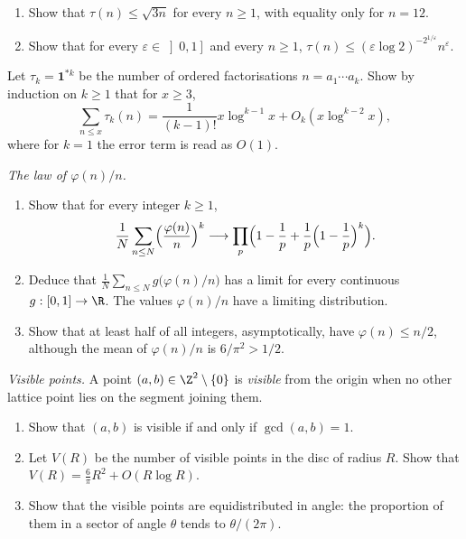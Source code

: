 \begin{exercise}[$\star\star$]\label{ex:taubound}
\begin{enumerate}[label=(\alph*)]
\item Show that $\tau(n)\le\sqrt{3n}$ for every $n\ge1$, with equality only for $n=12$.
\item Show that for every $\varepsilon\in\left]0,1\right]$ and every $n\ge1$, $\tau(n)\le(\varepsilon\log2)^{-2^{1/\varepsilon}}n^\varepsilon$.
\end{enumerate}
\end{exercise}

\begin{exercise}[$\star\star$]\label{ex:tauk}
Let $\tau_k=\mathbf1^{*k}$ be the number of ordered factorisations $n=a_1\cdots a_k$. Show by induction on $k\ge1$ that for $x\ge3$,
\[
\sum_{n\le x}\tau_k(n)=\frac1{(k-1)!}x\log^{k-1}x+O_k(x\log^{k-2}x),
\]
where for $k=1$ the error term is read as $O(1)$.
\end{exercise}

\begin{exercise}[$\star\star$]\label{pb:phiovern}
\emph{The law of $\varphi(n)/n$.}
\begin{enumerate}[label=(\alph*)]
\item Show that for every integer $k\ge1$,
\[
\frac1N\sum_{n\le N}\Bigl(\frac{\varphi(n)}n\Bigr)^k\longrightarrow\prod_p\Bigl(1-\frac1p+\frac1p\Bigl(1-\frac1p\Bigr)^k\Bigr).
\]
\item Deduce that $\frac1N\sum_{n\le N}g\bigl(\varphi(n)/n\bigr)$ has a limit for every continuous $g:[0,1]\to\R$. The values $\varphi(n)/n$ have a limiting distribution.
\item Show that at least half of all integers, asymptotically, have $\varphi(n)\le n/2$, although the mean of $\varphi(n)/n$ is $6/\pi^2>1/2$.
\end{enumerate}
\end{exercise}

\begin{exercise}[$\star\star$]\label{pb:visible}
\emph{Visible points.} A point $(a,b)\in\Z^2\setminus\{0\}$ is \emph{visible} from the origin when no other lattice point lies on the segment joining them.
\begin{enumerate}[label=(\alph*)]
\item Show that $(a,b)$ is visible if and only if $\gcd(a,b)=1$.
\item Let $V(R)$ be the number of visible points in the disc of radius $R$. Show that $V(R)=\frac6\pi R^2+O(R\log R)$.
\item Show that the visible points are equidistributed in angle: the proportion of them in a sector of angle $\theta$ tends to $\theta/(2\pi)$.
\end{enumerate}
\end{exercise}


